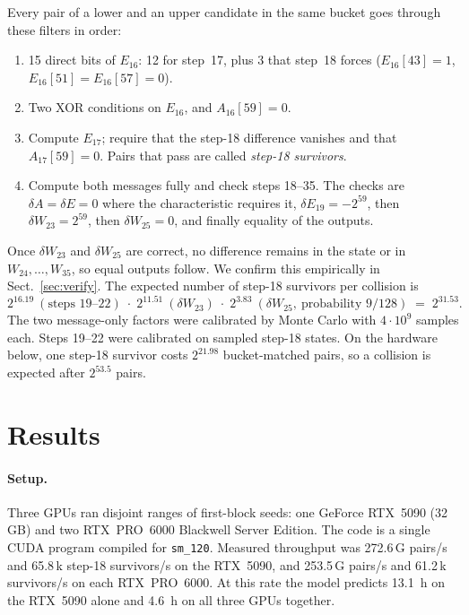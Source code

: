 \documentclass[11pt]{article}
\begin{document}
Every pair of a lower and an upper candidate in the same bucket goes through these filters in order:
\begin{enumerate}
\item 15 direct bits of $E_{16}$: 12 for step~17, plus 3 that step~18 forces ($E_{16}[43]=1$, $E_{16}[51]=E_{16}[57]=0$).
\item Two XOR conditions on $E_{16}$, and $A_{16}[59]=0$.
\item Compute $E_{17}$; require that the step-18 difference vanishes and that $A_{17}[59]=0$. Pairs that pass are called \emph{step-18 survivors}.
\item Compute both messages fully and check steps 18--35. The checks are $\delta A=\delta E=0$ where the characteristic requires it, $\delta E_{19}=-2^{59}$, then $\delta W_{23}=2^{59}$, then $\delta W_{25}=0$, and finally equality of the outputs.
\end{enumerate}
Once $\delta W_{23}$ and $\delta W_{25}$ are correct, no difference remains in the state or in $W_{24},\dots,W_{35}$, so equal outputs follow. We confirm this empirically in Sect.~\ref{sec:verify}. The expected number of step-18 survivors per collision is
\[
2^{16.19}\ (\text{steps }19\text{--}22)\;\cdot\;2^{11.51}\ (\delta W_{23})\;\cdot\;2^{3.83}\ (\delta W_{25},\ \text{probability }9/128) \;=\; 2^{31.53}.
\]
The two message-only factors were calibrated by Monte Carlo with $4\cdot 10^9$ samples each. Steps 19--22 were calibrated on sampled step-18 states. On the hardware below, one step-18 survivor costs $2^{21.98}$ bucket-matched pairs, so a collision is expected after $2^{53.5}$ pairs.

\section{Results}\label{sec:results}

\paragraph{Setup.} Three GPUs ran disjoint ranges of first-block seeds: one GeForce RTX~5090 (32\,GB) and two RTX~PRO~6000 Blackwell Server Edition. The code is a single CUDA program compiled for \texttt{sm\_120}. Measured throughput was 272.6\,G pairs/s and 65.8\,k step-18 survivors/s on the RTX~5090, and 253.5\,G pairs/s and 61.2\,k survivors/s on each RTX~PRO~6000. At this rate the model predicts 13.1~h on the RTX~5090 alone and 4.6~h on all three GPUs together.
\end{document}
